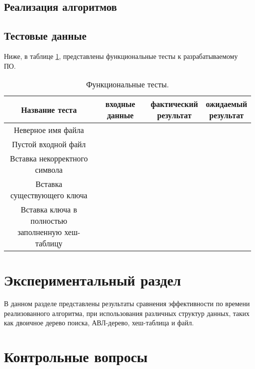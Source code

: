 \section{Реализация алгоритмов}

\section{Тестовые данные}

Ниже, в таблице \ref{table:func}, представлены функциональные тесты к разрабатываемому ПО.

\begin{table}
    \begin{center}
        \caption{Функциональные тесты.}
        \begin{tabular}{|c|c|c|c|}
            \hline
            Название теста & входные данные & \specialcell{фактический \\ результат} & \specialcell{ожидаемый \\ результат} \\
            \hline
            Неверное имя файла & & & \\
            \hline
            Пустой входной файл & & & \\
            \hline
            Вставка некорректного символа & & & \\
            \hline
            Вставка существующего ключа & & & \\
            \hline
            \specialcell{Вставка ключа в полностью \\ заполненную хеш-таблицу} & & & \\
            \hline
        \end{tabular}
        \label{table:func}
    \end{center}
\end{table}

\chapter{Экспериментальный раздел}

В данном разделе представлены результаты сравнения эффективности по времени реализованного алгоритма, при использования различных структур данных, таких как двоичное дерево поиска, АВЛ-дерево, хеш-таблица и файл.


\chapter{Контрольные вопросы}

